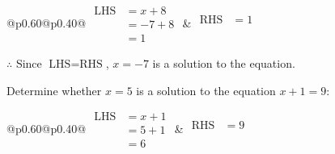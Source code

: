 \documentclass[12pt]{article}
\newcounter{minipagecount}
\begin{document}
\begin{multicols}{2}
\begin{minipage}[t]{0.40\textwidth}
    \noindent
    \renewcommand{\arraystretch}{1.3} %
    \begin{tabular}{@{}p{0.60\linewidth}@{}p{0.40\linewidth}@{}}
        \(\begin{aligned}
            \text{LHS} &= x + 8 \\
                    &= -7 + 8 \\
                    &= 1
        \end{aligned}\) &
        \(\begin{aligned}
            \text{RHS} &= 1\\
                    & \\
                    &
        \end{aligned}\)
    \end{tabular}
    \renewcommand{\arraystretch}{1.0} %
    \vspace{2pt}  %

    \noindent \(\therefore\) Since \(\text{LHS} = \text{RHS}\), \(x = -7\) is  a solution to the equation.

\end{minipage}

 \vspace*{16pt}
\noindent{(\theminipagecount)}\hspace{0.1mm} %
\begin{minipage}[t]{0.40\textwidth} %

    \noindent Determine whether \(x = 5\) is a solution to the equation \(x + 1 = 9\):
    \vspace{4pt}  %

    \noindent
    \renewcommand{\arraystretch}{1.3} %
    \begin{tabular}{@{}p{0.60\linewidth}@{}p{0.40\linewidth}@{}}
        \(\begin{aligned}
            \text{LHS} &= x + 1 \\
                    &= 5 + 1 \\
                    &= 6
        \end{aligned}\) &
        \(\begin{aligned}
            \text{RHS} &= 9\\
                    & \\
                    &
        \end{aligned}\)
    \end{tabular}
    \renewcommand{\arraystretch}{1.0} %
    \vspace{2pt}  %


\end{minipage}
\end{multicols}
\end{document}
